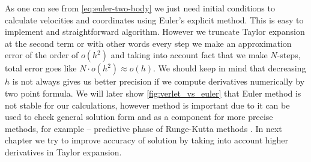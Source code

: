 \documentclass[10pt]{article}
\begin{document}
As one can see from \ref{eq:euler-two-body} we just need initial conditions to calculate velocities and coordinates using Euler's explicit method. This is  easy to implement and straightforward algorithm. However we truncate Taylor expansion at the second term or with other words every step we make an approximation error of the order of $o(h^2)$ and taking into account fact that we make $N$-steps, total error goes like $N\cdot o(h^2)\approx o(h)$.
We should keep in mind that decreasing $h$ is not always gives us better precision if we compute derivatives numerically by two point formula.
We will later show \ref{fig:verlet_vs_euler} that Euler method is not stable for our calculations, however method is important due to it can be used to check general solution form and as a component for more precise methods, for example -- predictive phase of Runge-Kutta methods \cite{one}.
In next chapter we try to improve accuracy of solution by taking into account higher derivatives in Taylor expansion.
\end{document}

